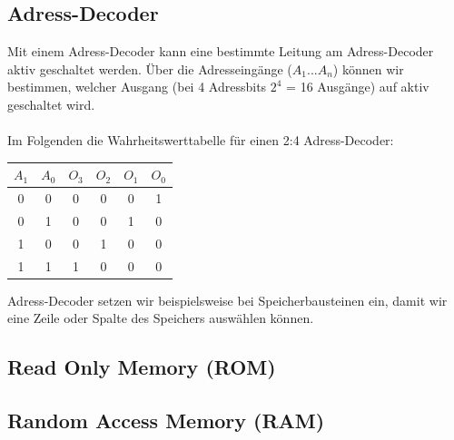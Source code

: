 \documentclass{report}
\begin{document}
\subsection{Adress-Decoder}
Mit einem Adress-Decoder kann eine bestimmte Leitung am Adress-Decoder aktiv geschaltet werden. Über die Adresseingänge ($A_1 ... A_n$) können wir bestimmen, welcher Ausgang (bei 4 Adressbits $2^4$ = 16 Ausgänge) auf aktiv geschaltet wird.
\\\\
Im Folgenden die Wahrheitswerttabelle für einen 2:4 Adress-Decoder:
\begin{center}\begin{tabular}{c c | c c c c}
$A_1$ & $A_0$ & $O_3$ & $O_2$ & $O_1$ & $O_0$ \\ \hline
0 & 0 & 0 & 0 & 0 & 1\\
0 & 1 & 0 & 0 & 1 & 0\\
1 & 0 & 0 & 1 & 0 & 0\\
1 & 1 & 1 & 0 & 0 & 0\end{tabular}\end{center}
Adress-Decoder setzen wir beispielsweise bei Speicherbausteinen ein, damit wir eine Zeile oder Spalte des Speichers auswählen können.
\subsection{Read Only Memory (ROM)}

\subsection{Random Access Memory (RAM)}
\end{document}
